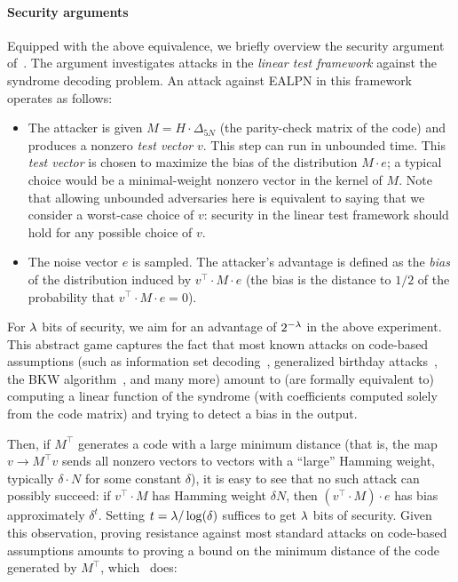 \paragraph{Security arguments} Equipped with the above equivalence, we briefly overview the security argument of~\cite{C:BCGIKR22}. The argument investigates attacks in the \emph{linear test framework} against the syndrome decoding problem. An attack against {\sf EALPN} in this framework operates as follows:
\begin{itemize}
	\item The attacker is given $M = H\cdot \Delta_{5N}$ (the parity-check matrix of the code) and produces a nonzero \emph{test vector} $v$. This step can run in unbounded time. This \emph{test vector} is chosen to maximize the bias of the distribution $M\cdot e$; a typical choice would be a minimal-weight nonzero vector in the kernel of $M$. Note that allowing unbounded adversaries here is equivalent to saying that we consider a worst-case choice of $v$: security in the linear test framework should hold for any possible choice of $v$.
	\item The noise vector $e$ is sampled. The attacker's advantage is defined as the \emph{bias} of the distribution induced by $v^\intercal\cdot M\cdot e$ (the bias is the distance to $1/2$ of the probability that $v^\intercal\cdot M\cdot e = 0$).
\end{itemize}
For $\lambda$ bits of security, we aim for an advantage of $2^{-\lambda}$ in the above experiment. This abstract game captures the fact that most known attacks on code-based assumptions (such as information set decoding~\cite{Prange62}, generalized birthday attacks~\cite{C:Wagner02,EPRINT:Kirchner11}, the BKW algorithm~\cite{STOC:BluKalWas00,AR:L05}, and many more) amount to (are formally equivalent to) computing a linear function of the syndrome (with coefficients computed solely from the code matrix) and trying to detect a bias in the output.

Then, if $M^\intercal$ generates a code with a large minimum distance (that is, the map $v \to M^\intercal v$ sends all nonzero vectors to vectors with a ``large'' Hamming weight, typically $\delta \cdot N$ for some constant $\delta$), it is easy to see that no such attack can possibly succeed: if $v^\intercal\cdot M$ has Hamming weight $\delta N$, then $(v^\intercal\cdot M)\cdot e$ has bias approximately $\delta^t$. Setting $t= \lambda/ \log(\delta)$ suffices to get $\lambda$ bits of security. Given this observation, proving resistance against most standard attacks on code-based assumptions amounts to proving a bound on the minimum distance of the code generated by $M^\intercal$, which~\cite{C:BCGIKR22} does:

